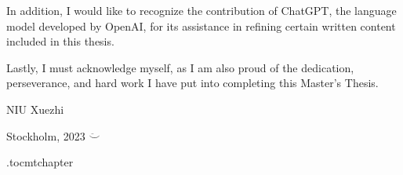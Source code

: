 In addition, I would like to recognize the contribution of ChatGPT, the language model developed by OpenAI, for its assistance in refining certain written content included in this thesis.

Lastly, I must acknowledge myself, as I am also proud of the dedication, perseverance, and hard work I have put into completing this Master's Thesis.

\vspace{2cm}
\hfill NIU Xuezhi 

\hfill Stockholm, \monthname{ }2023 $\ddot\smile$

\newpage



\newpage

\etocdepthtag.toc{mtchapter}

\tableofcontents
\pagestyle{plain}
\newpage


